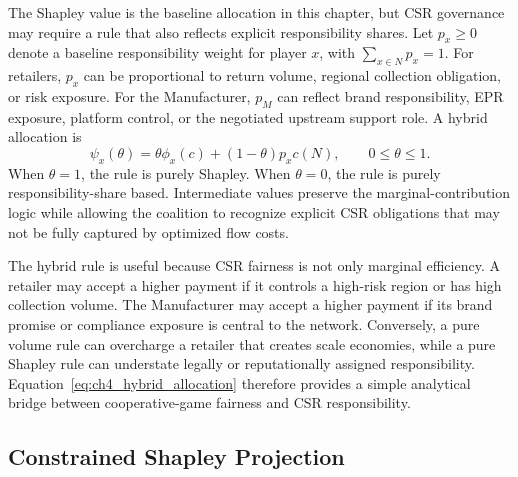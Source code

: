 The Shapley value is the baseline allocation in this chapter, but CSR governance may require a rule that also reflects explicit responsibility shares. Let $p_x\geq 0$ denote a baseline responsibility weight for player $x$, with $\sum_{x\in N}p_x=1$. For retailers, $p_x$ can be proportional to return volume, regional collection obligation, or risk exposure. For the Manufacturer, $p_M$ can reflect brand responsibility, EPR exposure, platform control, or the negotiated upstream support role. A hybrid allocation is
\begin{equation}
\label{eq:ch4_hybrid_allocation}
\psi_x(\theta)=\theta\phi_x(c)+(1-\theta)p_xc(N),
\qquad 0\leq \theta\leq 1.
\end{equation}
When $\theta=1$, the rule is purely Shapley. When $\theta=0$, the rule is purely responsibility-share based. Intermediate values preserve the marginal-contribution logic while allowing the coalition to recognize explicit CSR obligations that may not be fully captured by optimized flow costs.

The hybrid rule is useful because CSR fairness is not only marginal efficiency. A retailer may accept a higher payment if it controls a high-risk region or has high collection volume. The Manufacturer may accept a higher payment if its brand promise or compliance exposure is central to the network. Conversely, a pure volume rule can overcharge a retailer that creates scale economies, while a pure Shapley rule can understate legally or reputationally assigned responsibility. Equation~\eqref{eq:ch4_hybrid_allocation} therefore provides a simple analytical bridge between cooperative-game fairness and CSR responsibility.

\subsection{Constrained Shapley Projection}

